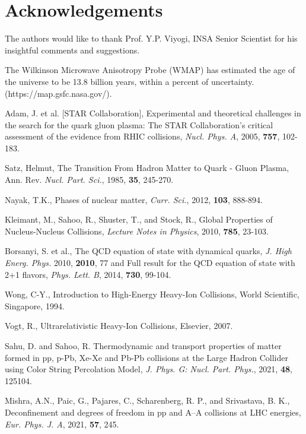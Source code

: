 \documentclass[showpacs,showkeys,aps,twocolumn]{revtex4}
\newcommand\+{\dagger}
\begin{document}
\section*{Acknowledgements}
The authors would like to thank Prof. Y.P. Viyogi, INSA Senior Scientist for his insightful comments and suggestions.

\begin{thebibliography}{99}
The Wilkinson Microwave Anisotropy Probe (WMAP) has estimated the age of the universe to be 13.8 billion years, within a percent of uncertainty. (https://map.gsfc.nasa.gov/).

 Adam, J. et al. [STAR Collaboration], Experimental and theoretical challenges in the search for the quark gluon plasma: The STAR Collaboration's critical assessment of the evidence from RHIC collisions, {\it Nucl. Phys. A}, 2005, {\bf 757}, 102-183.

	Satz, Helmut, The Transition From Hadron Matter to Quark - Gluon Plasma, Ann. Rev. {\it Nucl. Part. Sci.}, 1985, {\bf 35}, 245-270.

 Nayak, T.K., Phases of nuclear matter, {\it Curr. Sci.}, 2012, {\bf 103}, 888-894.

 Kleimant, M., Sahoo, R., Shuster, T., and Stock, R., Global Properties of Nucleus-Nucleus Collisions, {\it Lecture Notes in Physics}, 2010, {\bf 785}, 23-103.

 Borsanyi, S. et al., The QCD equation of state with dynamical quarks, {\it J. High Energ. Phys.} 2010, {\bf 2010}, 77 and Full result for the QCD equation of state with 2+1 flavors, {\it Phys. Lett. B}, 2014, {\bf 730}, 99-104.

 Wong, C-Y., Introduction to High-Energy Heavy-Ion Collisions, World Scientific, Singapore, 1994.

Vogt, R., Ultrarelativistic Heavy-Ion Collisions, Elsevier, 2007.

 Sahu, D. and Sahoo, R.  Thermodynamic and transport properties of matter formed in pp, p-Pb, Xe-Xe and Pb-Pb collisions at the Large Hadron Collider using Color String Percolation Model, {\it J. Phys. G: Nucl. Part. Phys.}, 2021, {\bf 48}, 125104.

Mishra, A.N., Paic, G., Pajares, C., Scharenberg, R. P., and Srivastava, B. K., Deconfinement and degrees of freedom in pp and A--A collisions at LHC energies, {\it Eur. Phys. J. A}, 2021, {\bf 57}, 245.


\end{thebibliography}
\end{document}
